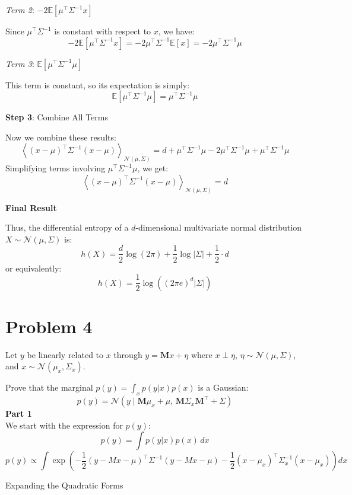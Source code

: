 \documentclass{article}
\begin{document}
\textit{Term 2}: \( -2 \mathbb{E} \left[ \mu^\top \Sigma^{-1} x \right] \)

Since \( \mu^\top \Sigma^{-1} \) is constant with respect to \( x \), we have:
\[
-2 \mathbb{E} \left[ \mu^\top \Sigma^{-1} x \right] = -2 \mu^\top \Sigma^{-1} \mathbb{E}[x] = -2 \mu^\top \Sigma^{-1} \mu
\]

\textit{Term 3}: \( \mathbb{E} \left[ \mu^\top \Sigma^{-1} \mu \right] \)

This term is constant, so its expectation is simply:
\[
\mathbb{E} \left[ \mu^\top \Sigma^{-1} \mu \right] = \mu^\top \Sigma^{-1} \mu
\]

\textbf{Step 3}: Combine All Terms

Now we combine these results:
\[
\left< (x - \mu)^\top \Sigma^{-1} (x - \mu) \right>_{\mathcal{N}(\mu, \Sigma)} = d + \mu^\top \Sigma^{-1} \mu - 2 \mu^\top \Sigma^{-1} \mu + \mu^\top \Sigma^{-1} \mu
\]
Simplifying terms involving \( \mu^\top \Sigma^{-1} \mu \), we get:
\[
\left< (x - \mu)^\top \Sigma^{-1} (x - \mu) \right>_{\mathcal{N}(\mu, \Sigma)} = d
\]

\textbf{Final Result}

Thus, the differential entropy of a \( d \)-dimensional multivariate normal distribution \( X \sim \mathcal{N}(\mu, \Sigma) \) is:
\[
h(X) = \frac{d}{2} \log(2 \pi) + \frac{1}{2} \log |\Sigma| + \frac{1}{2} \cdot d
\]
or equivalently:
\[
h(X) = \frac{1}{2} \log \left( (2 \pi e)^d |\Sigma| \right)
\]

\section*{Problem 4}

Let \( y \) be linearly related to \( x \) through
\(
y = \mathbf{M} x + \eta
\)
where \( x \perp \eta \), \( \eta \sim \mathcal{N}(\mu, \Sigma) \), and \( x \sim \mathcal{N}(\mu_x, \Sigma_x) \). 

Prove that the marginal \( p(y) = \int_x p(y|x) p(x) \) is a Gaussian:
\[
p(y) = \mathcal{N} \left( y \mid \mathbf{M} \mu_x + \mu, \, \mathbf{M} \Sigma_x \mathbf{M}^\top + \Sigma \right)
\]
\textbf{Part 1} \\

We start with the expression for \( p(y) \):
\[
p(y) = \int p(y | x) p(x) \, dx
\]
\[
p(y) \propto \int \exp \left( -\frac{1}{2} (y - Mx - \mu)^\top \Sigma^{-1} (y - Mx - \mu) - \frac{1}{2} (x - \mu_x)^\top \Sigma_x^{-1} (x - \mu_x) \right) dx
\]

Expanding the Quadratic Forms
\end{document}
